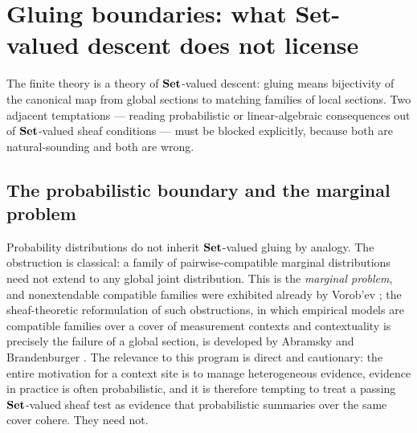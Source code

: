 \section{Gluing boundaries: what Set-valued descent does not license}
\label{ch12:sec:gluing}

The finite theory is a theory of $\mathbf{Set}$-valued descent: gluing means
bijectivity of the canonical map from global sections to matching families
of local sections. Two adjacent temptations --- reading probabilistic or
linear-algebraic consequences out of $\mathbf{Set}$-valued sheaf conditions --- must
be blocked explicitly, because both are natural-sounding and both are
wrong.

\subsection{The probabilistic boundary and the marginal problem}
\label{ch12:sec:probability}

Probability distributions do not inherit $\mathbf{Set}$-valued gluing by analogy.
The obstruction is classical: a family of pairwise-compatible marginal
distributions need not extend to any global joint distribution. This is the
\emph{marginal problem}, and nonextendable compatible families were
exhibited already by Vorob'ev \cite{vorobev}; the sheaf-theoretic
reformulation of such obstructions, in which empirical models are
compatible families over a cover of measurement contexts and contextuality
is precisely the failure of a global section, is developed by Abramsky and
Brandenburger \cite{abramskybrandenburger}. The relevance to this program
is direct and cautionary: the entire motivation for a context site is to
manage heterogeneous evidence, evidence in practice is often probabilistic,
and it is therefore tempting to treat a passing $\mathbf{Set}$-valued sheaf test as
evidence that probabilistic summaries over the same cover cohere. They need
not.

